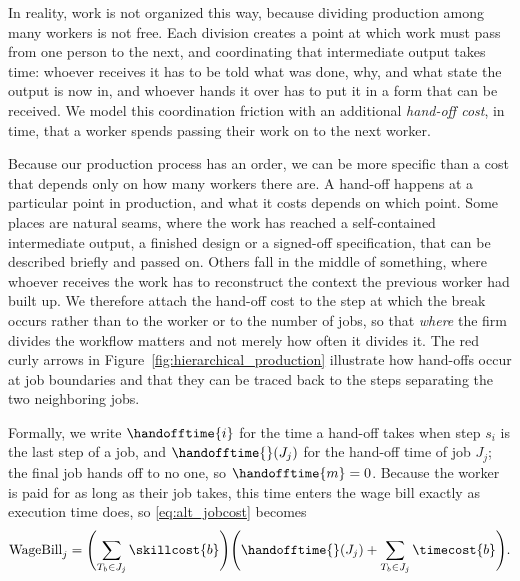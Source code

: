 In reality, work is not organized this way, because dividing production among many workers is not free.
Each division creates a point at which work must pass from one person to the next, and coordinating that intermediate output takes time: whoever receives it has to be told what was done, why, and what state the output is now in, and whoever hands it over has to put it in a form that can be received.
We model this coordination friction with an additional \emph{hand-off cost}, in time, that a worker spends passing their work on to the next worker.

Because our production process has an order, we can be more specific than a cost that depends only on how many workers there are.
A hand-off happens at a particular point in production, and what it costs depends on which point.
Some places are natural seams, where the work has reached a self-contained intermediate output, a finished design or a signed-off specification, that can be described briefly and passed on.
Others fall in the middle of something, where whoever receives the work has to reconstruct the context the previous worker had built up.
We therefore attach the hand-off cost to the step at which the break occurs rather than to the worker or to the number of jobs, so that \emph{where} the firm divides the workflow matters and not merely how often it divides it.
The red curly arrows in Figure~\ref{fig:hierarchical_production} illustrate how hand-offs occur at job boundaries and that they can be traced back to the steps separating the two neighboring jobs.

Formally, we write $\handofftime{i}$ for the time a hand-off takes when step $s_i$ is the last step of a job, and $\handofftime{}(J_j)$ for the hand-off time of job $J_j$; the final job hands off to no one, so $\handofftime{m} = 0$.
Because the worker is paid for as long as their job takes, this time enters the wage bill exactly as execution time does, so \eqref{eq:alt_jobcost} becomes
\begin{align}
\label{eq:alt_wagebill}
\text{WageBill}_j = \Biggl(\sum_{T_b \in J_j} \skillcost{b} \Biggr) \Biggl(\handofftime{}(J_j) + \sum_{T_b \in J_j} \timecost{b} \Biggr).
\end{align}


